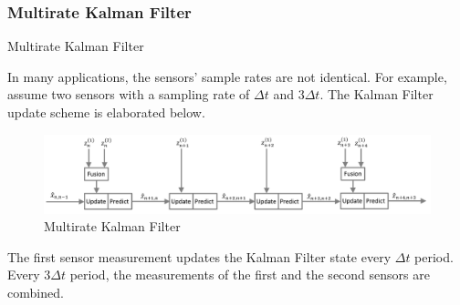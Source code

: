 \subsubsection{Multirate Kalman Filter}
\begin{frame}{Multirate Kalman Filter}

In many applications, the sensors’ sample rates are not identical. For example, assume two sensors with a sampling rate of $\Delta t$ and $3\Delta t$. The Kalman Filter update scheme is elaborated below.
\begin{figure}
    \centering
    \includegraphics[width=0.9\linewidth]{Figures//Part4/MR_KF.png}
    \caption{Multirate Kalman Filter}
\end{figure}
The first sensor measurement updates the Kalman Filter state every $\Delta t$ period. Every
$3\Delta t$ period, the measurements of the first and the second sensors are combined.
\end{frame}



